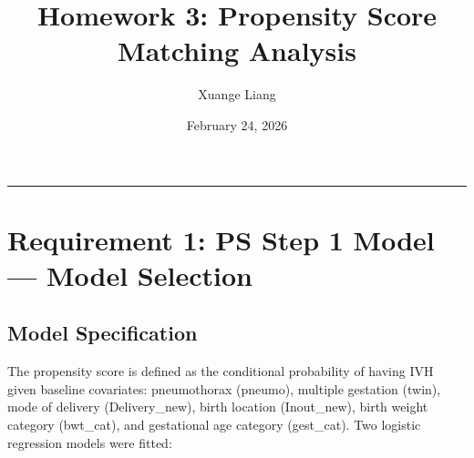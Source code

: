 \documentclass[
]{article}
\title{Homework 3: Propensity Score Matching Analysis}
\author{Xuange Liang}
\date{February 24, 2026}
\let\oldtableofcontents\tableofcontents
\renewcommand{\tableofcontents}{%
    \oldtableofcontents
    \clearpage
  }
\begin{document}
\maketitle

{
\setcounter{tocdepth}{3}
\tableofcontents
}



\begin{center}\rule{0.5\linewidth}{0.5pt}\end{center}

\hypertarget{requirement-1-ps-step-1-model-model-selection}{%
\section{Requirement 1: PS Step 1 Model --- Model
Selection}\label{requirement-1-ps-step-1-model-model-selection}}

\hypertarget{model-specification}{%
\subsection{Model Specification}\label{model-specification}}

The propensity score is defined as the conditional probability of having
IVH given baseline covariates: pneumothorax (pneumo), multiple gestation
(twin), mode of delivery (Delivery\_new), birth location (Inout\_new),
birth weight category (bwt\_cat), and gestational age category
(gest\_cat). Two logistic regression models were fitted:
\end{document}
